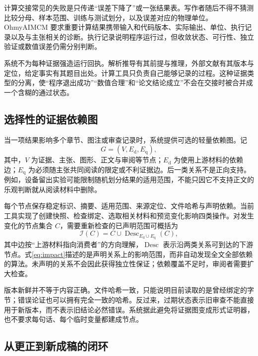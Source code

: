 \documentclass[UTF8,a4paper,zihao=-4,fontset=fandol]{ctexart}
\newcommand{\sys}{\textsf{OhmyAIMCM}}
\begin{document}
计算交接常见的失败是只传递“误差下降了”或一张结果表。写作者随后不得不猜测比较分母、样本范围、训练与测试划分，以及误差对应的物理单位。\sys{} 要求重要计算结果携带输入和代码版本、实际输出、单位、执行记录以及与主张相关的诊断。执行记录说明程序运行过，但收敛状态、可行性、独立验证或数值误差仍需分别判断。

系统不为每种证据强造运行回执。解析推导有其前提与推理，外部文献有其版本与定位，给定事实有其题目出处。计算工具只负责自己能够记录的过程。这种证据类型的分离，使“程序退出成功”“数值合理”和“论文结论成立”不会在交接时被合并成一个含糊的通过状态。

\subsection{选择性的证据依赖图}

当一项结果影响多个章节、图注或审查记录时，系统提供可选的轻量依赖图。记
\begin{equation}
G=(V,E_{\mathrm d},E_{\mathrm q}),
\label{eq:graph}
\end{equation}
其中，$V$ 为证据、主张、图形、正文与审阅等节点；$E_{\mathrm d}$ 为使用上游材料的依赖边；$E_{\mathrm q}$ 为必须随主张共同阅读的限定或不利证据边。后一类关系不是正向支持。例如，设备留出实验可能限制随机划分结果的适用范围，不能只因它不支持正文的乐观判断就从阅读材料中删除。

每个节点保存稳定标识、摘要、适用范围、来源定位、文件哈希与声明依赖。当前工具实现了创建快照、检查绑定、选取相关材料和预览变化影响四类操作\cite{coordinator}。对发生变化的节点集合 $C$，需要重新检查的已声明范围可概括为
\begin{equation}
\mathcal I(C)=C\cup\operatorname{Desc}_{E_{\mathrm d}\cup E_{\mathrm q}}(C),
\label{eq:impact}
\end{equation}
其中边按“上游材料指向消费者”的方向理解，$\operatorname{Desc}$ 表示沿两类关系可到达的下游节点。式\eqref{eq:impact}描述的是声明关系上的影响范围，而非自动发现全文全部依赖的算法。未声明的关系不会因此获得独立性保证；依赖覆盖不足时，审阅者需要扩大检查。

版本新鲜并不等于内容正确。文件哈希一致，只能说明目前读取的是曾经绑定的字节；错误论证也可以拥有完全一致的哈希。反过来，过期状态表示旧审查不能直接用于新版本，而不表示旧结论必然错误。系统据此避免将证据图变成形式证明器，也不要求每句话、每个临时变量都建成节点。

\subsection{从更正到新成稿的闭环}
\end{document}
